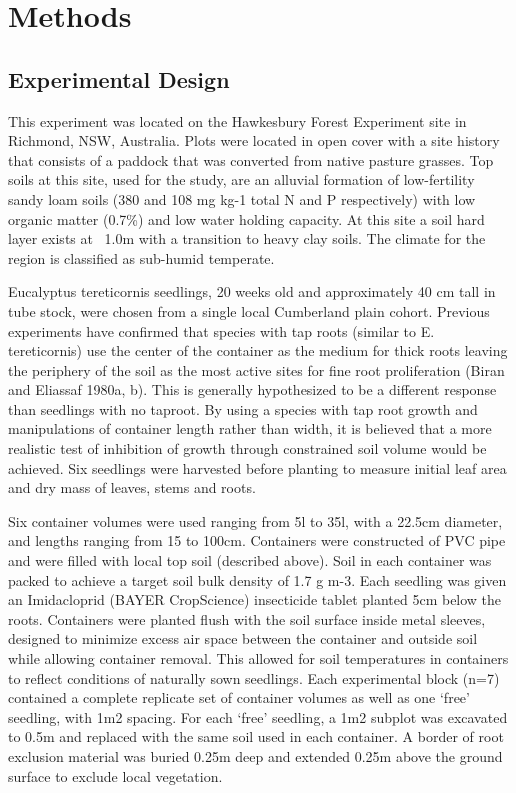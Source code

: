 \documentclass[a4paper]{article}\usepackage[]{graphicx}\usepackage[]{color}
\begin{document}
\section*{Methods}

\subsection*{Experimental Design}

This experiment was located on the Hawkesbury Forest Experiment site in Richmond, NSW, Australia. Plots were located in open cover with a site history that consists of a paddock that was converted from native pasture grasses. Top soils at this site, used for the study, are an alluvial formation of low-fertility sandy loam soils (380 and 108 mg kg-1 total N and P respectively) with low organic matter (0.7\%) and low water holding capacity. At this site a soil hard layer exists at ~1.0m with a transition to heavy clay soils. The climate for the region is classified as sub-humid temperate. 

Eucalyptus tereticornis seedlings, 20 weeks old and approximately 40 cm tall in tube stock, were chosen from a single local Cumberland plain cohort. Previous experiments have confirmed that species with tap roots (similar to E. tereticornis) use the center of the container as the medium for thick roots leaving the periphery of the soil as the most active sites for fine root proliferation (Biran and Eliassaf 1980a, b). This is generally hypothesized to be a different response than seedlings with no taproot. By using a species with tap root growth and manipulations of container length rather than width, it is believed that a more realistic test of inhibition of growth through constrained soil volume would be achieved. Six seedlings were harvested before planting to measure initial leaf area and dry mass of leaves, stems and roots.

Six container volumes were used ranging from 5l to 35l, with a 22.5cm diameter, and lengths ranging from 15 to 100cm. Containers were constructed of PVC pipe and were filled with local top soil (described above). Soil in each container was packed to achieve a target soil bulk density of 1.7 g m-3. Each seedling was given an Imidacloprid (BAYER CropScience) insecticide tablet planted 5cm below the roots. Containers were planted flush with the soil surface inside metal sleeves, designed to minimize excess air space between the container and outside soil while allowing container removal. This allowed for soil temperatures in containers to reflect conditions of naturally sown seedlings. Each experimental block (n=7) contained a complete replicate set of container volumes as well as one ‘free’ seedling, with 1m2 spacing. For each ‘free’ seedling, a 1m2 subplot was excavated to 0.5m and replaced with the same soil used in each container. A border of root exclusion material was buried 0.25m deep and extended 0.25m above the ground surface to exclude local vegetation.
\end{document}
